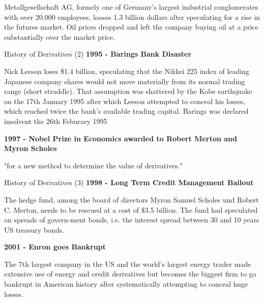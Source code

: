 



	Metallgesellschaft AG, formely one of Germany's largest industrial conglomerates with over 20.000 employees, looses 1.3 billion dollars after speculating for a rise in the futures market. Oil prices dropped and left the company buying oil at a price substantially over the market price.





{History of Derivatives (2)}
\textbf{1995 - Barings Bank Disaster }






	Nick Leeson loses $\$$1.4 billion, speculating that the Nikkei 225 index of leading Japanese company shares would not move materially from its normal trading range (short straddle). That assumption was shattered by the Kobe earthquake on the 17th January 1995 after which Leeson attempted to conceal his losses, which reached twice the bank's available trading capital. Barings was declared insolvent the 26th Feburary 1995




\textbf{1997 - Nobel Prize in Economics awarded to Robert Merton and Myron Scholes}






	"for a new method to determine the value of derivatives."





{History of Derivatives (3)}
\textbf{1998 - Long Term Credit Management Bailout}






	The hedge fund, among the board of directors Myron Samuel Scholes und Robert C. Merton, needs to be rescued at a cost of $\$$3.5 billion. The fund had speculated on spreads of govern-ment bonds, i.e. the interest spread between 30 and 10 years US treasury bonds.




\textbf{2001 - Enron goes Bankrupt}






	The 7th largest company in the US and the world's largest energy trader made extensive use of energy and credit derivatives but becomes the biggest firm to go bankrupt in American history after systematically attempting to conceal huge losses.


